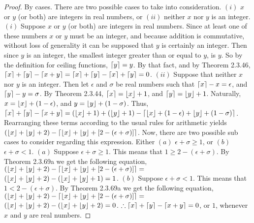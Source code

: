 \documentclass[a4paper, 12pt]{article}
\theoremstyle{plain}
\DeclarePairedDelimiter{\floor}{\lfloor}{\rfloor}
\DeclarePairedDelimiter{\ceil}{\lceil}{\rceil}
\begin{document}
\begin{proof}
    By cases. There are two possible cases to take into consideration. \newline $(i)$ $x$ or 
    $y$ (or both) are integers in real numbers, or $(ii)$ neither $x$ nor $y$ is an integer.
    \newline
    \newline
    $(i)$ Suppose $x$ or $y$ (or both) are integers in real numbers. Since at least one of 
    these numbers $x$ or $y$ must be an integer, and because addition is commutative, without 
    loss of generality it can be supposed that $y$ is certainly an integer.	Then since $y$ is 
    an integer, the smallest integer greater than or equal to $y$, is $y$. So by the 
    definition for ceiling functions, $\ceil{y} = y$. By that fact, and by Theorem 2.3.46, 
    $\ceil{x} + \ceil{y} - \ceil{x + y} = \ceil{x} + \ceil{y} - \ceil{x} + \ceil{y} = 0$.
    \newline
    \newline
    $(ii)$ Suppose that neither $x$ nor $y$ is an integer. Then let $\epsilon$ and $\sigma$ be 
    real numbers such that $\ceil{x} - x = \epsilon$, and $\ceil{y} - y = \sigma$. By Theorem 
    2.3.44, $\ceil{x} = \floor{x} + 1$, and $\ceil{y} = \floor{y} + 1$. Naturally, 
    $x = \floor{x} + (1 - \epsilon)$, and $y = \floor{y} + (1 - \sigma)$. Thus, 
    $\ceil{x} + \ceil{y} - \ceil{x + y} = 
    (\floor{x}+1) + (\floor{y}+1) - \ceil{\floor{x} + (1 - \epsilon) + \floor{y} + (1 - \sigma)}$. 
    Rearranging these terms according to the usual rules for arithmetic yields 
    $(\floor{x} + \floor{y} + 2) - \ceil{\floor{x} + \floor{y} + [2 - (\epsilon + \sigma)]}$. 
    Now, there are two possible sub cases to consider regarding this expression. Either 
    $(a)$ $\epsilon + \sigma \ge 1$, or $(b)$ $\epsilon + \sigma < 1$.
    \newline
    \newline
    \indent $(a)$ Suppose 
    $\epsilon + \sigma \ge 1$. This means that $1 \ge 2 - (\epsilon + \sigma)$. By  \newline 
    \indent Theorem 2.3.69a we get the following equation, \newline \indent 
    $(\floor{x} + \floor{y} + 2) - \ceil{\floor{x} + \floor{y} + [2 - (\epsilon + \sigma)]} =$ 
    \newline \indent $(\floor{x} + \floor{y} + 2) - (\floor{x} + \floor{y} + 1) = 1$.
    \newline
    \newline
    \indent $(b)$ Suppose $\epsilon + \sigma < 1$. This means that $1 < 2 - (\epsilon + \sigma)$. 
    By \newline \indent Theorem 2.3.69a we get the following equation, \newline \indent 
    $(\floor{x} + \floor{y} + 2) - \ceil{\floor{x} + \floor{y} + [2 - (\epsilon + \sigma)]} =$ 
    \newline \indent $(\floor{x} + \floor{y} + 2) - (\floor{x} + \floor{y} + 2) = 0$.
    \newline
    \newline
    $\therefore \ceil{x} + \ceil{y} - \ceil{x + y} = 0$, or $1$, whenever $x$ and $y$ are real 
    numbers.
\end{proof}
\end{document}

